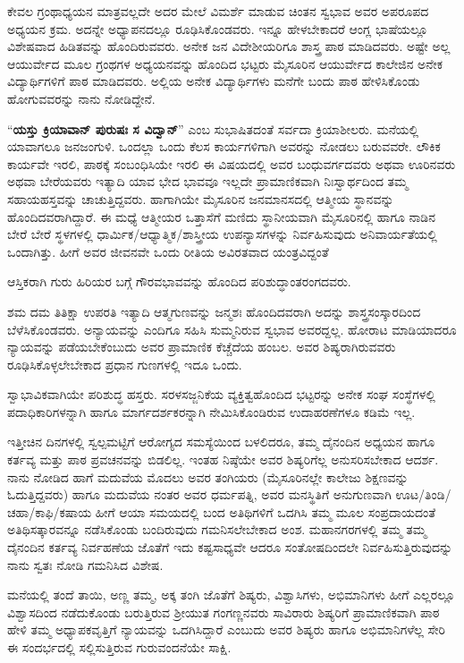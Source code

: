 {ಕೇವಲ ಗ್ರಂಥಾಧ್ಯಯನ ಮಾತ್ರವಲ್ಲದೇ ಅದರ ಮೇಲೆ ವಿಮರ್ಶೆ ಮಾಡುವ ಚಿಂತನ ಸ್ವಭಾವ ಅವರ ಅಪರೂಪದ ಅಧ್ಯಯನ ಕ್ರಮ. ಅದನ್ನೇ ಅಧ್ಯಾಪನದಲ್ಲೂ ರೂಢಿಸಿಕೊಂಡವರು. ಇನ್ನೂ ಹೇಳಬೇಕಾದರೆ ಆಂಗ್ಲ ಭಾಷೆಯಲ್ಲೂ ವಿಶೇಷವಾದ ಹಿಡಿತವನ್ನು ಹೊಂದಿರುವವರು. ಅನೇಕ ಜನ ವಿದೇಶೀಯರಿಗೂ ಶಾಸ್ತ್ರ ಪಾಠ ಮಾಡಿದವರು. ಅಷ್ಟೇ ಅಲ್ಲ ಆಯುರ್ವೇದ ಮೂಲ ಗ್ರಂಥಗಳ ಅಧ್ಯಯನವನ್ನು ಹೊಂದಿದ ಭಟ್ಟರು ಮೈಸೂರಿನ ಆಯುರ್ವೇದ ಕಾಲೇಜಿನ ಅನೇಕ ವಿದ್ಯಾರ್ಥಿಗಳಿಗೆ ಪಾಠ ಮಾಡಿದವರು. ಅಲ್ಲಿಯ ಅನೇಕ ವಿದ್ಯಾರ್ಥಿಗಳು ಮನೆಗೇ ಬಂದು ಪಾಠ ಹೇಳಿಸಿಕೊಂಡು ಹೋಗುವವರನ್ನು ನಾನು ನೋಡಿದ್ದೇನೆ.

“\textbf{ಯಸ್ತು ಕ್ರಿಯಾವಾನ್ ಪುರುಷಃ ಸ ವಿದ್ವಾನ್}” ಎಂಬ ಸುಭಾಷಿತದಂತೆ ಸರ್ವದಾ ಕ್ರಿಯಾಶೀಲರು. ಮನೆಯಲ್ಲಿ ಯಾವಾಗಲೂ ಜನಜಂಗುಳಿ. ಒಂದಲ್ಲಾ ಒಂದು ಕೆಲಸ  \enginline{-}  ಕಾರ್ಯಗಳಿಗಾಗಿ ಅವರನ್ನು ನೋಡಲು ಬರುವವರೇ. ಲೌಕಿಕ ಕಾರ್ಯವೇ ಇರಲಿ, ಪಾಠಕ್ಕೆ ಸಂಬಂಧಿಸಿಯೇ ಇರಲಿ ಈ ವಿಷಯದಲ್ಲಿ ಅವರ ಬಂಧುವರ್ಗದವರು ಅಥವಾ ಊರಿನವರು ಅಥವಾ ಬೇರೆಯವರು ಇತ್ಯಾದಿ ಯಾವ ಭೇದ  \enginline{-}  ಭಾವವೂ ಇಲ್ಲದೇ ಪ್ರಾಮಾಣಿಕವಾಗಿ ನಿಃಸ್ವಾರ್ಥದಿಂದ ತಮ್ಮ ಸಹಾಯಹಸ್ತವನ್ನು ಚಾಚುತ್ತಿದ್ದವರು. ಹಾಗಾಗಿಯೇ ಮೈಸೂರಿನ ಜನಮಾನಸದಲ್ಲಿ ಆತ್ಮೀಯ ಸ್ಥಾನವನ್ನು ಹೊಂದಿದವರಾಗಿದ್ದಾರೆ. ಈ ಮಧ್ಯೆ ಆತ್ಮೀಯರ ಒತ್ತಾಸೆಗೆ ಮಣಿದು ಸ್ಥಾನೀಯವಾಗಿ ಮೈಸೂರಿನಲ್ಲಿ ಹಾಗೂ ನಾಡಿನ ಬೇರೆ ಬೇರೆ ಸ್ಥಳಗಳಲ್ಲಿ ಧಾರ್ಮಿಕ/ಆಧ್ಯಾತ್ಮಿಕ/ಶಾಸ್ತ್ರೀಯ ಉಪನ್ಯಾಸಗಳನ್ನು ನಿರ್ವಹಿಸುವುದು ಅನಿವಾರ್ಯತೆಯಲ್ಲಿ ಒಂದಾಗಿತ್ತು. ಹೀಗೆ ಅವರ ಜೀವನವೇ ಒಂದು ರೀತಿಯ ಅವಿರತವಾದ ಯಂತ್ರವಿದ್ದಂತೆ

ಆಸ್ತಿಕರಾಗಿ ಗುರು  \enginline{-}  ಹಿರಿಯರ ಬಗ್ಗೆ ಗೌರವಭಾವವನ್ನು ಹೊಂದಿದ ಪರಿಶುದ್ಧಾಂತರಂಗದವರು. 

ಶಮ  \enginline{-}  ದಮ  \enginline{-}  ತಿತಿಕ್ಷಾ  \enginline{-}  ಉಪರತಿ ಇತ್ಯಾದಿ ಆತ್ಮಗುಣವನ್ನು ಜನ್ಮಶಃ ಹೊಂದಿದವರಾಗಿ ಅದನ್ನು ಶಾಸ್ತ್ರಸಂಸ್ಕಾರದಿಂದ ಬೆಳೆಸಿಕೊಂಡವರು. ಅನ್ಯಾಯವನ್ನು ಎಂದಿಗೂ ಸಹಿಸಿ ಸುಮ್ಮನಿರುವ ಸ್ವಭಾವ ಅವರದ್ದಲ್ಲ. ಹೋರಾಟ ಮಾಡಿಯಾದರೂ ನ್ಯಾಯವನ್ನು ಪಡೆಯಬೇಕೆಂಬುದು ಅವರ ಪ್ರಾಮಾಣಿಕ ಕೆಚ್ಚೆದೆಯ ಹಂಬಲ. ಅವರ ಶಿಷ್ಯರಾಗಿರುವವರು ರೂಢಿಸಿಕೊಳ್ಳಲೇಬೇಕಾದ ಪ್ರಧಾನ ಗುಣಗಳಲ್ಲಿ ಇದೂ ಒಂದು.

ಸ್ವಾಭಾವಿಕವಾಗಿಯೇ ಪರಿಶುದ್ಧ ಹಸ್ತರು. ಸರಳಸಜ್ಜನಿಕೆಯ ವ್ಯಕ್ತಿತ್ವಹೊಂದಿದ ಭಟ್ಟರನ್ನು ಅನೇಕ ಸಂಘ ಸಂಸ್ಥೆಗಳಲ್ಲಿ ಪದಾಧಿಕಾರಿಗಳನ್ನಾಗಿ ಹಾಗೂ ಮಾರ್ಗದರ್ಶಕರನ್ನಾಗಿ ನೇಮಿಸಿಕೊಂಡಿರುವ ಉದಾಹರಣೆಗಳೂ ಕಡಿಮೆ ಇಲ್ಲ.

ಇತ್ತೀಚಿನ ದಿನಗಳಲ್ಲಿ ಸ್ವಲ್ಪಮಟ್ಟಿಗೆ ಆರೋಗ್ಯದ ಸಮಸ್ಯೆಯಿಂದ ಬಳಲಿದರೂ, ತಮ್ಮ ದೈನಂದಿನ ಅಧ್ಯಯನ ಹಾಗೂ ಕರ್ತವ್ಯ ಮತ್ತು ಪಾಠ ಪ್ರವಚನವನ್ನು ಬಿಡಲಿಲ್ಲ. ಇಂತಹ ನಿಷ್ಠೆಯೇ ಅವರ ಶಿಷ್ಯರಿಗೆಲ್ಲ ಅನುಸರಿಸಬೇಕಾದ ಆದರ್ಶ. ನಾನು ನೋಡಿದ ಹಾಗೆ ಮದುವೆಯ ಮೊದಲು ಅವರ ತಂಗಿಯರು (ಮೈಸೂರಿನಲ್ಲೇ ಕಾಲೇಜು ಶಿಕ್ಷಣವನ್ನು ಓದುತ್ತಿದ್ದವರು) ಹಾಗೂ ಮದುವೆಯ ನಂತರ ಅವರ ಧರ್ಮಪತ್ನಿ, ಅವರ ಮನಸ್ಥಿತಿಗೆ ಅನುಗುಣವಾಗಿ ಊಟ/ತಿಂಡಿ/ಚಹಾ/ಕಾಫಿ/ಕಷಾಯ ಹೀಗೆ ಆಯಾ ಸಮಯದಲ್ಲಿ ಬಂದ ಅತಿಥಿಗಳಿಗೆ ಒದಗಿಸಿ ತಮ್ಮ ಮೂಲ ಸಂಪ್ರದಾಯದಂತೆ ಅತಿಥಿಸತ್ಕಾರವನ್ನೂ ನಡೆಸಿಕೊಂಡು ಬಂದಿರುವುದು ಗಮನಿಸಲೇಬೇಕಾದ ಅಂಶ. ಮಹಾನಗರಗಳಲ್ಲಿ ತಮ್ಮ ತಮ್ಮ ದೈನಂದಿನ ಕರ್ತವ್ಯ ನಿರ್ವಹಣೆಯ ಜೊತೆಗೆ ಇದು ಕಷ್ಟಸಾಧ್ಯವೇ ಆದರೂ ಸಂತೋಷದಿಂದಲೇ ನಿರ್ವಹಿಸುತ್ತಿರುವುದನ್ನು ನಾನು ಸ್ವತಃ ನೋಡಿ ಗಮನಿಸಿದ ವಿಶೇಷ.

ಮನೆಯಲ್ಲಿ ತಂದೆ  \enginline{-}  ತಾಯಿ, ಅಣ್ಣ  \enginline{-}  ತಮ್ಮ, ಅಕ್ಕ  \enginline{-}  ತಂಗಿ ಜೊತೆಗೆ ಶಿಷ್ಯರು, ವಿಶ್ವಾಸಿಗಳು, ಅಭಿಮಾನಿಗಳು ಹೀಗೆ ಎಲ್ಲರಲ್ಲೂ ವಿಶ್ವಾಸದಿಂದ ನಡೆದುಕೊಂಡು ಬರುತ್ತಿರುವ ಶ್ರೀಯುತ ಗಂಗಣ್ಣನವರು ಸಾವಿರಾರು ಶಿಷ್ಯರಿಗೆ ಪ್ರಾಮಾಣಿಕವಾಗಿ ಪಾಠ ಹೇಳಿ ತಮ್ಮ ಅಧ್ಯಾಪಕವೃತ್ತಿಗೆ ನ್ಯಾಯವನ್ನು ಒದಗಿಸಿದ್ದಾರೆ ಎಂಬುದು ಅವರ ಶಿಷ್ಯರು ಹಾಗೂ ಅಭಿಮಾನಿಗಳೆಲ್ಲ ಸೇರಿ ಈ ಸಂದರ್ಭದಲ್ಲಿ ಸಲ್ಲಿಸುತ್ತಿರುವ ಗುರುವಂದನೆಯೇ ಸಾಕ್ಷಿ.

}
